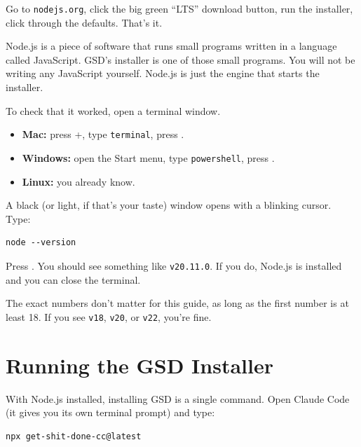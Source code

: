 \documentclass[11pt,letterpaper,openany]{book}
\begin{document}
Go to \texttt{nodejs.org}, click the big green ``LTS'' download button, run
the installer, click through the defaults. That's it.

\begin{gsdnote}
Node.js is a piece of software that runs small programs written in a
language called JavaScript. GSD's installer is one of those small programs.
You will not be writing any JavaScript yourself. Node.js is just the engine
that starts the installer.
\end{gsdnote}

To check that it worked, open a terminal window.

\begin{itemize}
  \item \textbf{Mac:} press +, type
        \texttt{terminal}, press .
  \item \textbf{Windows:} open the Start menu, type
        \texttt{powershell}, press .
  \item \textbf{Linux:} you already know.
\end{itemize}

A black (or light, if that's your taste) window opens with a blinking cursor.
Type:

\begin{lstlisting}
node --version
\end{lstlisting}

Press . You should see something like \texttt{v20.11.0}. If
you do, Node.js is installed and you can close the terminal.

\begin{gsdtip}
The exact numbers don't matter for this guide, as long as the first number
is at least 18. If you see \texttt{v18}, \texttt{v20}, or \texttt{v22},
you're fine.
\end{gsdtip}

\section{Running the GSD Installer}

With Node.js installed, installing GSD is a single command. Open Claude
Code (it gives you its own terminal prompt) and type:

\begin{lstlisting}
npx get-shit-done-cc@latest
\end{lstlisting}
\end{document}
